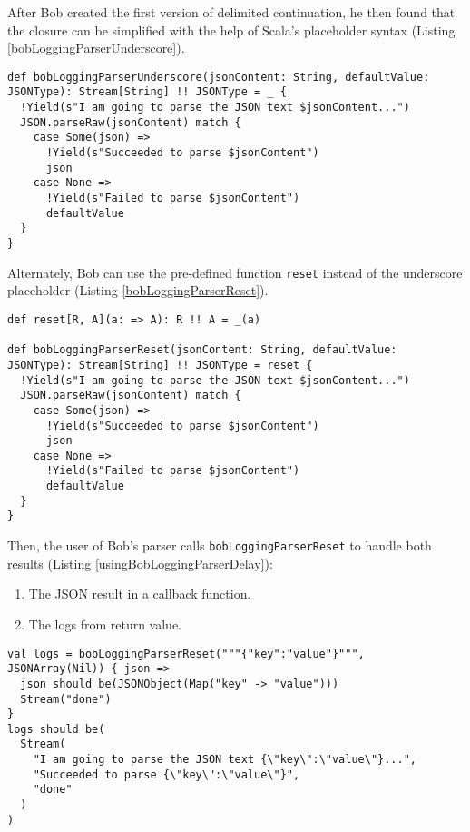 After Bob created the first version of delimited continuation, he then found that the closure can be simplified with the help of Scala's placeholder syntax (Listing \ref{bobLoggingParserUnderscore}).

\begin{lstlisting}[caption={The implementation of Bob's logging parser, the underscore placeholder version},label={bobLoggingParserUnderscore}]
def bobLoggingParserUnderscore(jsonContent: String, defaultValue: JSONType): Stream[String] !! JSONType = _ {
  !Yield(s"I am going to parse the JSON text $jsonContent...")
  JSON.parseRaw(jsonContent) match {
    case Some(json) =>
      !Yield(s"Succeeded to parse $jsonContent")
      json
    case None =>
      !Yield(s"Failed to parse $jsonContent")
      defaultValue
  }
}
\end{lstlisting}

Alternately, Bob can use the pre-defined function \lstinline{reset} instead of the underscore placeholder (Listing \ref{bobLoggingParserReset}).

\begin{lstlisting}[caption={The implementation of Bob's logging parser, the reset version},label={bobLoggingParserReset}]
def reset[R, A](a: => A): R !! A = _(a)

def bobLoggingParserReset(jsonContent: String, defaultValue: JSONType): Stream[String] !! JSONType = reset {
  !Yield(s"I am going to parse the JSON text $jsonContent...")
  JSON.parseRaw(jsonContent) match {
    case Some(json) =>
      !Yield(s"Succeeded to parse $jsonContent")
      json
    case None =>
      !Yield(s"Failed to parse $jsonContent")
      defaultValue
  }
}
\end{lstlisting}

Then, the user of Bob's parser calls \lstinline{bobLoggingParserReset} to handle both results (Listing \ref{usingBobLoggingParserDelay}):

\begin{enumerate}
  \item The JSON result in a callback function.
  \item The logs from return value.
\end{enumerate}

\begin{lstlisting}[caption={Using Bob's parser},label={usingBobLoggingParserDelay}]
val logs = bobLoggingParserReset("""{"key":"value"}""", JSONArray(Nil)) { json =>
  json should be(JSONObject(Map("key" -> "value")))
  Stream("done")
}
logs should be(
  Stream(
    "I am going to parse the JSON text {\"key\":\"value\"}...",
    "Succeeded to parse {\"key\":\"value\"}",
    "done"
  )
)
\end{lstlisting}

